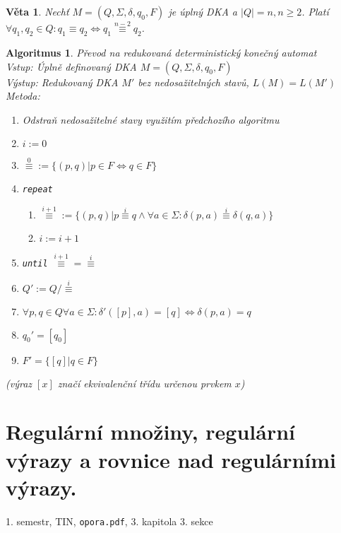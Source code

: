 \documentclass[a4paper, 11pt]{report}
\newtheorem{veta}{Věta}[chapter]
\newtheorem{alg}{Algoritmus}[chapter]
\begin{document}
\begin{veta}
Nechť $M=(Q,\Sigma,\delta,q_0,F)$ je úplný DKA a $|Q| = n, n \geq 2$. Platí $\forall q_1, q_2 \in Q: q_1 \equiv q_2 \Leftrightarrow q_1 \overset{n-2}{\equiv} q_2$.
\end{veta}

\begin{alg}
Převod na redukovaná deterministický konečný automat\\
Vstup: Úplně definovaný DKA $M = (Q, \Sigma, \delta, q_0, F)$\\
Výstup: Redukovaný DKA $M'$ bez nedosažitelných stavů, $L(M) = L(M')$\\
Metoda:
\begin{enumerate}
	\item Odstraň nedosažitelné stavy využitím předchozího algoritmu
	\item $i := 0$
	\item $\overset{0}{\equiv} := \{(p, q)|p \in F \Leftrightarrow q \in F\}$
	\item \texttt{repeat}
	\begin{enumerate}
		\item $\overset{i+1}{\equiv} := \{(p, q)|p \overset{i}{\equiv} q \land \forall a \in \Sigma: \delta(p,a) \overset{i}{\equiv} \delta(q, a)\}$
		\item $i := i + 1$
	\end{enumerate}
	\item \texttt{until} $\overset{i+1}{\equiv} = \overset{i}{\equiv}$
	\item $Q' := Q/\overset{i}{\equiv}$
	\item $\forall p,q \in Q \forall a \in \Sigma: \delta'([p], a) = [q] \Leftrightarrow \delta(p,a) = q$
	\item $q_0' = [q_0]$
	\item $F' = \{[q] | q \in F\}$
\end{enumerate}
(výraz $[x]$ značí ekvivalenční třídu určenou prvkem $x$)
\end{alg}







\chapter{Regulární množiny, regulární výrazy a rovnice nad regulárními výrazy.} \label{cha:19}
1. semestr, TIN, \texttt{opora.pdf}, 3. kapitola 3. sekce
\end{document}
